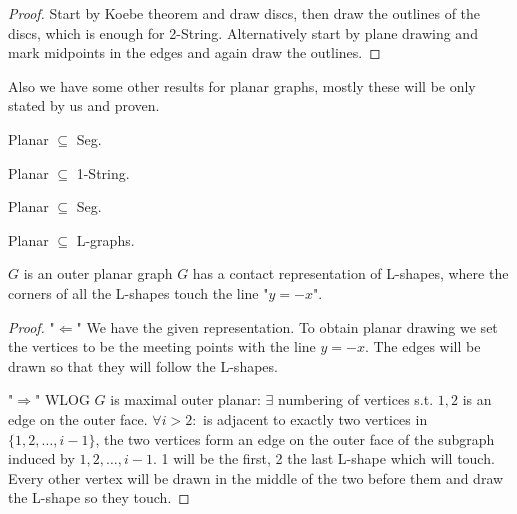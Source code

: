 \begin{proof}
	Start by Koebe theorem and draw discs, then draw the outlines of the discs, which is enough for 2-String. Alternatively start by plane drawing and mark midpoints in the edges and again draw the outlines.
\end{proof}

\noindent Also we have some other results for planar graphs, mostly these will be only stated by us and proven.

\begin{thm}
	Planar $\subseteq$ Seg.
\end{thm}

\begin{thm}
	Planar $\subseteq$ 1-String.
\end{thm}

\begin{thm}
	Planar $\subseteq$ Seg.
\end{thm}

\begin{thm}
	Planar $\subseteq$ L-graphs.
\end{thm}

\begin{thm}
	$G$ is an outer planar graph \ifft $G$ has a contact representation of L-shapes, where the corners of all the L-shapes touch the line "$y = -x$".
\end{thm}

\begin{proof}
	"$\Leftarrow$" We have the given representation. To obtain planar drawing we set the vertices to be the meeting points with the line $y = -x$. The edges will be drawn so that they will follow the L-shapes.
	
	"$\Rightarrow$" WLOG $G$ is maximal outer planar: $\exists$ numbering of vertices s.t. $1,2$ is an edge on the outer face. $\forall i > 2:$ is adjacent to exactly two vertices in $\{1,2, \dots, i -1\}$, the two vertices form an edge on the outer face of the subgraph induced by $1,2, \dots, i-1$. 1 will be the first, 2 the last L-shape which will touch. Every other vertex will be drawn in the middle of the two before them and draw the L-shape so they touch.
\end{proof}